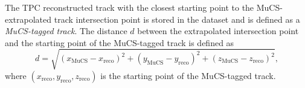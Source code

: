 \documentclass[a4paper,11pt]{article}
\begin{document}
The TPC reconstructed track with the closest starting point to the MuCS-extrapolated track intersection point is stored in the dataset and is defined as a \emph{MuCS-tagged track}.
The distance $d$ between the extrapolated intersection point and the starting point of the MuCS-tagged track is defined as
\begin{equation}\label{eq:d}
d = \sqrt{(x_{\mathrm{MuCS}}-x_{\mathrm{reco}})^2+(y_{\mathrm{MuCS}}-y_{\mathrm{reco}})^2+(z_{\mathrm{MuCS}}-z_{\mathrm{reco}})^2},
\end{equation}
where $(x_{\mathrm{reco}},y_{\mathrm{reco}},z_{\mathrm{reco}})$ is the starting point of the MuCS-tagged track.

\end{document}
